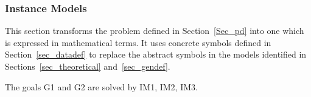 \documentclass[12pt]{article}
\newcommand{\colAwidth}{0.13\textwidth}
\newcommand{\colBwidth}{0.82\textwidth}
\begin{document}


\subsubsection{Instance Models} \label{sec_instance}    


This section transforms the problem defined in Section~\ref{Sec_pd} into 
one which is expressed in mathematical terms. It uses concrete symbols defined 
in Section~\ref{sec_datadef} to replace the abstract symbols in the models 
identified in Sections~\ref{sec_theoretical} and~\ref{sec_gendef}.

The goals G1 and G2 are solved by IM1, IM2, IM3.

~\newline

\end{document}
